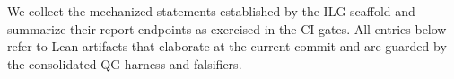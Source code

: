 \documentclass[aps,prd,twocolumn,superscriptaddress,nofootinbib,floatfix,longbibliography]{revtex4-2}
\newcommand{\lean}[1]{\texttt{\detokenize{#1}}}
\begin{document}
%
%
We collect the mechanized statements established by the ILG scaffold and summarize their report endpoints as exercised in the CI gates. All entries below refer to Lean artifacts that elaborate at the current commit and are guarded by the consolidated QG harness and falsifiers.
%
%
\end{document}
